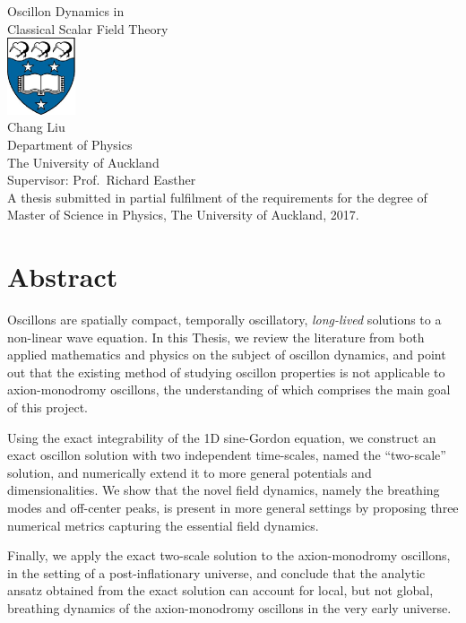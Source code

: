 \documentclass[11pt]{book}
\begin{document}
\pagestyle{empty}
\begin{center}
\vspace{1cm}
{\Huge Oscillon Dynamics in\\Classical Scalar Field Theory}\\
\vspace{35mm} 
\includegraphics[width=2cm]{logo.jpg}\\
\vspace{45mm}
{\Large Chang Liu}\\
\vspace{1ex}
Department of Physics\\
The University of Auckland\\
\vspace{5ex}
Supervisor: Prof.~Richard Easther\\
\vspace*{30mm}
A thesis submitted in partial fulfilment of the requirements for the degree of Master of Science in Physics, The University of Auckland, 2017.
\end{center}

\newpage

\chapter*{Abstract}       
Oscillons are spatially compact, temporally oscillatory, {\em long-lived} solutions to a non-linear wave equation. In this Thesis, we review the literature from both applied mathematics and physics on the subject of oscillon dynamics, and point out that the existing method of studying oscillon properties is not applicable to axion-monodromy oscillons, the understanding of which comprises the main goal of this project.

Using the exact integrability of the 1D sine-Gordon equation, we construct an exact oscillon solution with two independent time-scales, named the ``two-scale'' solution, and numerically extend it to more general potentials and dimensionalities. We show that the novel field dynamics, namely the breathing modes and off-center peaks, is present in more general settings by proposing three numerical metrics capturing the essential field dynamics.

Finally, we apply the exact two-scale solution to the axion-monodromy oscillons, in the setting of a post-inflationary universe, and conclude that the analytic ansatz obtained from the exact solution can account for local, but not global, breathing dynamics of the axion-monodromy oscillons in the very early universe.
\end{document}
